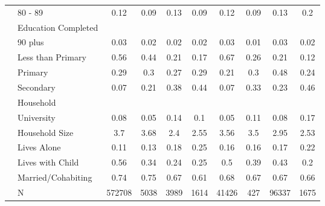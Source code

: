 \begin{table}[ht]
\begin{tabular}{>{\raggedright\arraybackslash}p{3.2cm}l|cccccccc}
   & 80 - 89 & 0.12 & 0.09 & 0.13 & 0.09 & 0.12 & 0.09 & 0.13 & 0.2 \\ 
   & Education Completed &  &  &  &  &  &  &  &  \\ 
   & 90 plus & 0.03 & 0.02 & 0.02 & 0.02 & 0.03 & 0.01 & 0.03 & 0.02 \\ 
   & Less than Primary & 0.56 & 0.44 & 0.21 & 0.17 & 0.67 & 0.26 & 0.21 & 0.12 \\ 
   & Primary & 0.29 & 0.3 & 0.27 & 0.29 & 0.21 & 0.3 & 0.48 & 0.24 \\ 
   & Secondary & 0.07 & 0.21 & 0.38 & 0.44 & 0.07 & 0.33 & 0.23 & 0.46 \\ 
   & Household &  &  &  &  &  &  &  &  \\ 
   & University & 0.08 & 0.05 & 0.14 & 0.1 & 0.05 & 0.11 & 0.08 & 0.17 \\ 
   & Household Size & 3.7 & 3.68 & 2.4 & 2.55 & 3.56 & 3.5 & 2.95 & 2.53 \\ 
   & Lives Alone & 0.11 & 0.13 & 0.18 & 0.25 & 0.16 & 0.16 & 0.17 & 0.22 \\ 
   & Lives with Child & 0.56 & 0.34 & 0.24 & 0.25 & 0.5 & 0.39 & 0.43 & 0.2 \\ 
   & Married/Cohabiting & 0.74 & 0.75 & 0.67 & 0.61 & 0.68 & 0.67 & 0.67 & 0.66 \\ 
   & N & 572708 & 5038 & 3989 & 1614 & 41426 & 427 & 96337 & 1675 \\ 
   \hline
\end{tabular}
\endgroup
\end{table}
